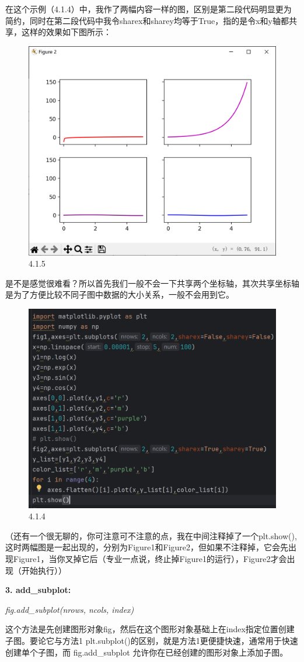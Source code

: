 \documentclass[12pt]{article}
\begin{document}
在这个示例（4.1.4）中，我作了两幅内容一样的图，区别是第二段代码明显更为简约，同时在第二段代码中我令sharex和sharey均等于True，指的是令x和y轴都共享，这样的效果如下图所示：
\begin{figure}[H]
    \centering
    \includegraphics[width=0.45\linewidth]{创建子图 Pic2.png}
    \caption{4.1.5}
    \label{fig:enter-label}
\end{figure}
是不是感觉很难看？所以首先我们一般不会一下共享两个坐标轴，其次共享坐标轴是为了方便比较不同子图中数据的大小关系，一般不会用到它。
\begin{figure}[H]
    \centering
    \includegraphics[width=0.75\linewidth]{创建子图 program2.png}
    \caption{4.1.4}
    \label{fig:enter-label}
\end{figure}
（还有一个很无聊的，你可注意可不注意的点，我在中间注释掉了一个plt.show(),这时两幅图是一起出现的，分别为Figure1和Figure2，但如果不注释掉，它会先出现Figure1，当你叉掉它后（专业一点说，终止掉Figure1的运行），Figure2才会出现（开始执行））


\noindent\textbf{\large 3. add\_subplot:}

\textit{fig.add\_subplot(nrows, ncols, index)}

这个方法是先创建图形对象fig，然后在这个图形对象基础上在index指定位置创建子图。要论它与方法1 plt.subplot()的区别，就是方法1更便捷快速，通常用于快速创建单个子图，而 fig.add\_subplot 允许你在已经创建的图形对象上添加子图。
\end{document}
